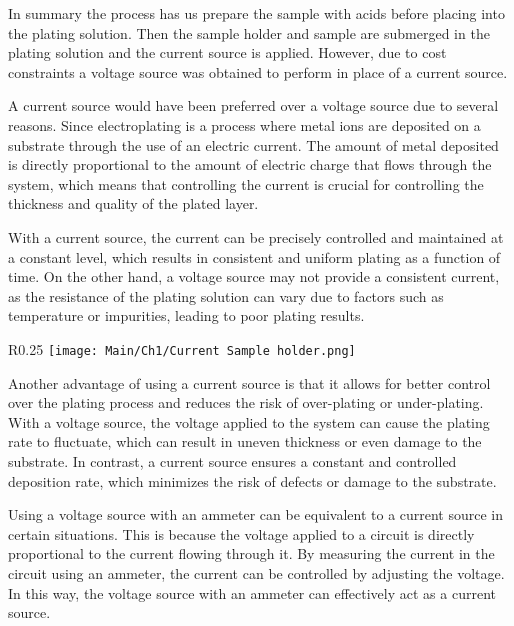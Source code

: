 In summary the process has us prepare the sample with acids before placing into the plating solution. Then the sample holder and sample are submerged in the plating solution and the current source is applied. However, due to cost constraints a voltage source was obtained to perform in place of a current source.


A current source would have been preferred over a voltage source due to several reasons. Since electroplating is a process where metal ions are deposited on a substrate through the use of an electric current. The amount of metal deposited is directly proportional to the amount of electric charge that flows through the system, which means that controlling the current is crucial for controlling the thickness and quality of the plated layer.

With a current source, the current can be precisely controlled and maintained at a constant level, which results in consistent and uniform plating as a function of time. On the other hand, a voltage source may not provide a consistent current, as the resistance of the plating solution can vary due to factors such as temperature or impurities, leading to poor plating results.

\begin{wrapfigure}{R}{0.25\textwidth}
    \centering
    \texttt{[image: Main/Ch1/Current Sample holder.png]}
    \caption{Line drawing of the alligator clip and sample }
\end{wrapfigure}

Another advantage of using a current source is that it allows for better control over the plating process and reduces the risk of over-plating or under-plating. With a voltage source, the voltage applied to the system can cause the plating rate to fluctuate, which can result in uneven thickness or even damage to the substrate. In contrast, a current source ensures a constant and controlled deposition rate, which minimizes the risk of defects or damage to the substrate.

Using a voltage source with an ammeter can be equivalent to a current source in certain situations. This is because the voltage applied to a circuit is directly proportional to the current flowing through it. By measuring the current in the circuit using an ammeter, the current can be controlled by adjusting the voltage. In this way, the voltage source with an ammeter can effectively act as a current source.


